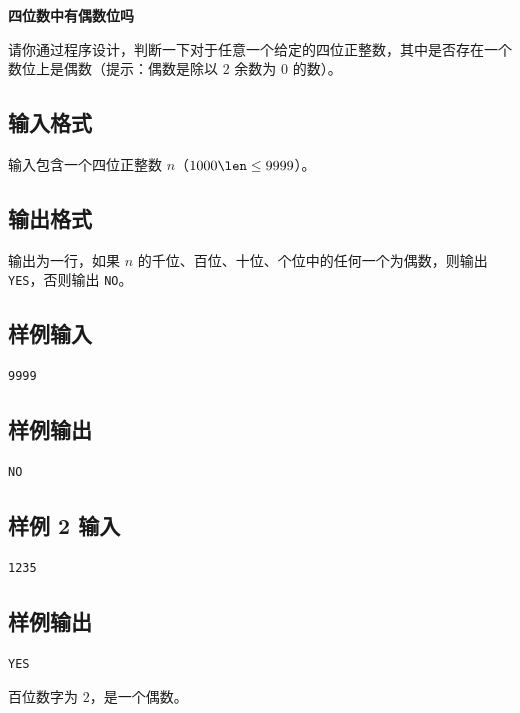 \documentclass{article}
\newcommand{\problemname}[1]{\begin{center}\Large\bfseries #1\end{center}}
\begin{document}
\problemname{四位数中有偶数位吗}

请你通过程序设计，判断一下对于任意一个给定的四位正整数，其中是否存在一个数位上是偶数（提示：偶数是除以 $2$ 余数为 $0$ 的数）。

\subsection*{输入格式}
输入包含一个四位正整数 $n$（$1000\len\le9999$）。

\subsection*{输出格式}
输出为一行，如果 $n$ 的千位、百位、十位、个位中的任何一个为偶数，则输出 \texttt{YES}，否则输出 \texttt{NO}。

\subsection*{样例输入}
\begin{verbatim}
9999
\end{verbatim}

\subsection*{样例输出}
\begin{verbatim}
NO
\end{verbatim}

\subsection*{样例 2 输入}
\begin{verbatim}
1235
\end{verbatim}

\subsection*{样例输出}
\begin{verbatim}
YES
\end{verbatim}

百位数字为 $2$，是一个偶数。
\end{document}

